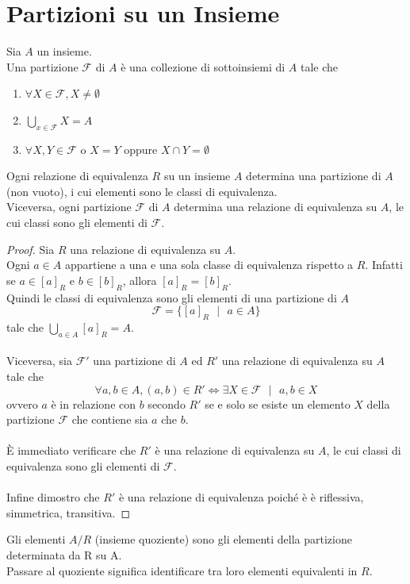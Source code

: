 \documentclass[a4paper,12pt, oneside]{book}
\begin{document}
\section{Partizioni su un Insieme}
\begin{definizione}
	Sia $A$ un insieme.\\
	Una partizione $\mathcal{F}$ di $A$ è una collezione di sottoinsiemi di $A$ tale che \begin{enumerate}
		\item $\forall X \in \mathcal{F}, X \not = \emptyset$
		\item $\displaystyle\bigcup_{x \in \mathcal{F}} X = A$
		\item $\forall X,Y \in \mathcal{F} \mbox{ o } X=Y \mbox{ oppure } X \cap Y = \emptyset$
	\end{enumerate}
\end{definizione}
\begin{teorema}
	Ogni relazione di equivalenza $R$ su un insieme $A$ determina una partizione di $A$ (non vuoto), i cui elementi sono le classi di equivalenza.\\
	Viceversa, ogni partizione $\mathcal{F}$ di $A$ determina una relazione di equivalenza su $A$, le cui classi sono gli elementi di $\mathcal{F}$.
	\begin{proof}
		Sia $R$ una relazione di equivalenza su $A$.\\
		Ogni $a \in A$ appartiene a una e una sola classe di equivalenza rispetto a $R$. Infatti se $a \in [a]_{R}$ e $b \in [b]_{R}$, allora $[a]_{R} = [b]_{R}$.\\
		Quindi le classi di equivalenza sono gli elementi di una partizione di $A$
		$$\mathcal{F} = \{[a]_{R} \mbox{  } | \mbox{  } a \in A\}$$
		tale che $\displaystyle\bigcup_{a \in A} [a]_{R} = A$.\\\\
		Viceversa, sia $\mathcal{F}'$ una partizione di $A$ ed $R'$ una relazione di equivalenza su $A$ tale che
		$$\forall a,b \in A, (a,b) \in R' \iff \exists X \in \mathcal{F} \mbox{  } | \mbox{ } a,b \in X$$
		ovvero $a$ è in relazione con $b$ secondo $R'$ se e solo se esiste un elemento $X$ della partizione $\mathcal{F}$ che contiene sia $a$ che $b$.\\\\
		È immediato verificare che $R'$ è una relazione di equivalenza su $A$, le cui classi di equivalenza sono gli elementi di $\mathcal{F}$.\\\\
		Infine dimostro che $R'$ è una relazione di equivalenza poiché è è riflessiva, simmetrica, transitiva.
	\end{proof}
\end{teorema}
\begin{nota}
	Gli elementi $A/R$ (insieme quoziente) sono gli elementi della partizione determinata da R su A.\\Passare al quoziente significa identificare tra loro elementi equivalenti in $R$.
\end{nota}
\end{document}
